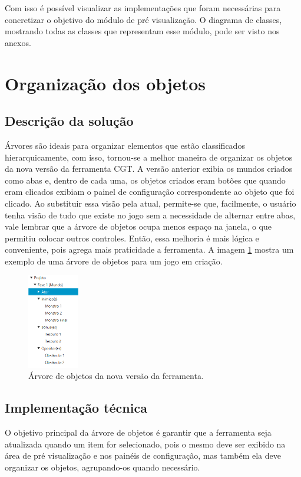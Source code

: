 \documentclass[12pt,twoside,openright,a4paper,english,brazil,sumario=tradicional]{abntex2}
\begin{document}
Com isso é possível visualizar as implementações que foram necessárias para concretizar o objetivo do módulo de pré visualização. O diagrama de classes, mostrando todas as classes que representam esse módulo, pode ser visto nos anexos.

\section{Organização dos objetos}

\subsection{Descrição da solução}
Árvores são ideais para organizar elementos que estão classificados hierarquicamente, com isso, tornou-se a melhor maneira de organizar os objetos da nova versão da ferramenta CGT.
A versão anterior exibia os mundos criados como abas e, dentro de cada uma, os objetos criados eram botões que quando eram clicados exibiam o painel de configuração correspondente ao objeto que foi clicado.
Ao substituir essa visão pela atual, permite-se que, facilmente, o usuário tenha visão de tudo que existe no jogo sem a necessidade de alternar entre abas, vale lembrar que a árvore de objetos ocupa menos espaço na janela, o que permitiu colocar outros controles.
Então, essa melhoria é mais lógica e conveniente, pois agrega mais praticidade a ferramenta.
A imagem \ref{fig:arvore_objetos} mostra um exemplo de uma árvore de objetos para um jogo em criação.

\begin{figure}[h]
\centering
\includegraphics[width=0.2\textwidth]{images/arvore_objetos.png}
\caption{Árvore de objetos da nova versão da ferramenta.}
\label{fig:arvore_objetos}
\end{figure}

\subsection{Implementação técnica}
O objetivo principal da árvore de objetos é garantir que a ferramenta seja atualizada quando um item for selecionado, pois o mesmo deve ser exibido na área de pré visualização e nos painéis de configuração, mas também ela deve organizar os objetos, agrupando-os quando necessário.
\end{document}
